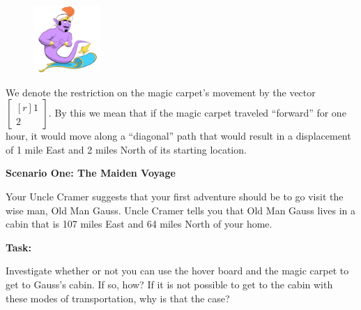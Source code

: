 \documentclass{problemset}
\newcommand{\mat}[1]{\begin{bmatrix*}[r]#1\end{bmatrix*}}
\begin{document}
\begin{minipage}{\textwidth}
	\vspace{.5cm}
	\begin{figure}
	\vspace{-.8cm}
	\includegraphics[width=1in]{images/MagicCarpet-small.png}
	\end{figure}

	We denote the restriction on the magic carpet's movement by the vector
	$\mat{1 \\2 }$. By this we mean that if the
	magic carpet traveled ``forward'' for one hour, it would move along a
	``diagonal'' path that would result in a displacement of 1 mile East and
	2 miles North of its starting location.
\end{minipage}


\vspace{10mm}

\textbf{Scenario One: The Maiden Voyage}

Your Uncle Cramer suggests that your first adventure should be to go visit
the wise man, Old Man Gauss. Uncle Cramer tells you that Old Man Gauss
lives in a cabin that is 107 miles East and 64 miles North of your home.

\vspace{5mm}

\textbf{Task:}
\par
Investigate whether or not you can use the hover board and the magic
carpet to get to Gauss's cabin. If so, how? If it is not possible to
get to the cabin with these modes of transportation, why is that the case?


\newpage
\end{document}
